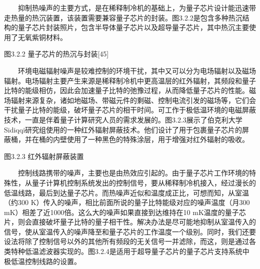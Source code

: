 \documentclass[a4paper,11pt,english]{sphinxmanual}
\begin{document}
\sphinxAtStartPar
  抑制热噪声的主要方式，是在稀释制冷机的基础上，为量子芯片设计能迅速带走热量的热沉装置，该装置需要兼容量子芯片的封装。图3.2.2是包含多种热沉结构的量子芯片封装照片，包含半导体量子芯片以及超导量子芯片，其中热沉主要使用了无氧紫铜材料。


\begin{center}图3.2.2 量子芯片的热沉与封装{[}45{]}
\end{center}
\sphinxAtStartPar
  环境电磁辐射噪声是较难控制的环境干扰，其中又可以分为电场辐射以及磁场辐射。电场辐射主要产生来源是稀释制冷机中更高温层的红外辐射，其频段和量子比特的能级相仿，因此会加速量子比特的弛豫过程，从而降低量子芯片的性能。磁场辐射来源复杂，诸如地磁场、带磁元件的剩磁、控制电流引发的磁场等，它们会干扰量子比特的能级，破坏量子芯片的相干时间。可工作于极低温环境的电磁屏蔽技术，一直是伴着量子计算研究人员的需求发展的。图3.2.3展示了伯克利大学Sidiqqi研究组使用的一种红外辐射屏蔽技术。他们设计了用于包裹量子芯片的屏蔽桶，并在桶的内壁使用了一种黑色的特殊涂层，用于增强对红外辐射的吸收。


\begin{center}图3.2.3 红外辐射屏蔽装置
\end{center}
\sphinxAtStartPar
  控制线路携带的噪声，主要也是由热效应引起的。由于量子芯片工作环境的特殊性，从量子计算机控制系统发出的控制信号，要从稀释制冷机接入，经过漫长的低温线路，最后到达量子芯片。而热噪声近似和温度成正比，可想而知，从室温（约300 K）传入的噪声，相比前面所说的量子比特能级对应的噪声温度（月300 mK）相差了近1000倍。这么大的噪声如果直接到达维持在10 mK温度的量子芯片，则会直接破坏量子比特的量子相干性。解决办法是尽可能地抑制从室温传入的信号，使从室温传入的噪声降至和量子芯片的工作温度一个级别。同时，我们还要设法将除了控制信号以外的其他所有频段的无关信号一并滤除，而这，则是通过各类特种低温滤波器实现的。图3.2.4是适用于超导量子芯片的量子芯片支持系统中极低温控制线路的设置。

\end{document}
